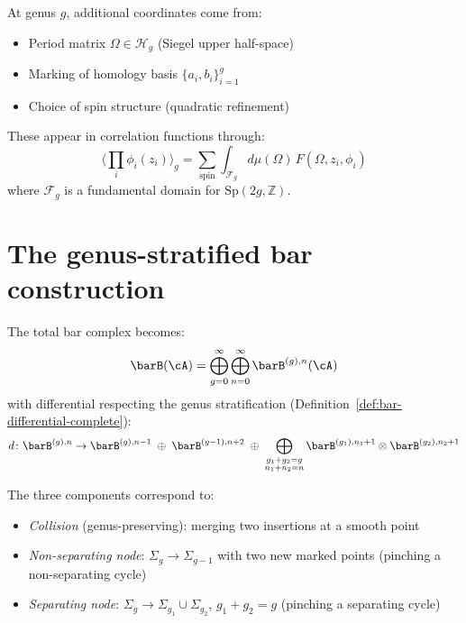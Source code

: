 At genus $g$, additional coordinates come from:
\begin{itemize}
\item Period matrix $\Omega \in \mathcal{H}_g$ (Siegel upper half-space)
\item Marking of homology basis $\{a_i, b_i\}_{i=1}^g$
\item Choice of spin structure (quadratic refinement)
\end{itemize}

These appear in correlation functions through:
\[\langle \prod_i \phi_i(z_i) \rangle_g = \sum_{\text{spin}} \int_{\mathcal{F}_g} d\mu(\Omega) \, F(\Omega, z_i, \phi_i)\]
where $\mathcal{F}_g$ is a fundamental domain for $\text{Sp}(2g, \mathbb{Z})$.

\section{The genus-stratified bar construction}

The total bar complex becomes:
\[\barB(\cA) = \bigoplus_{g=0}^{\infty} \bigoplus_{n=0}^{\infty} \barB^{(g),n}(\cA)\]
with differential respecting the genus stratification (Definition~\ref{def:bar-differential-complete}):
\[d\colon \barB^{(g),n} \to \barB^{(g),n-1} \;\oplus\; \barB^{(g-1),n+2} \;\oplus\; \bigoplus_{\substack{g_1+g_2=g \\ n_1+n_2=n}} \barB^{(g_1),n_1+1} \otimes \barB^{(g_2),n_2+1}\]

The three components correspond to:
\begin{itemize}
\item \emph{Collision} (genus-preserving): merging two insertions at a smooth point
\item \emph{Non-separating node}: $\Sigma_g \to \Sigma_{g-1}$ with two new marked points (pinching a non-separating cycle)
\item \emph{Separating node}: $\Sigma_g \to \Sigma_{g_1} \cup \Sigma_{g_2}$, $g_1 + g_2 = g$ (pinching a separating cycle)
\end{itemize}


